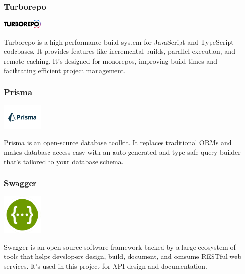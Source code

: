 \clearpage
\subsubsection*{Turborepo}

\begin{center}
\includegraphics[width=0.15\textwidth]{Images/logos/turbopack-logotype-light-background.png}
\label{fig:turborepo}
\end{center}
Turborepo is a high-performance build system for JavaScript and TypeScript codebases. It provides features like incremental builds, parallel execution, and remote caching. It’s designed for monorepos, improving build times and facilitating efficient project management.

\subsubsection*{Prisma}

\begin{center}
\includegraphics[width=0.15\textwidth]{Images/logos/Prisma.png}
\label{fig:prisma}
\end{center}
Prisma is an open-source database toolkit. It replaces traditional ORMs and makes database access easy with an auto-generated and type-safe query builder that’s tailored to your database schema.


\subsubsection*{Swagger}

\begin{center}
\includegraphics[width=0.15\textwidth]{Images/logos/Swagger-logo.png}
\label{fig:swagger}
\end{center}
Swagger is an open-source software framework backed by a large ecosystem of tools that helps developers design, build, document, and consume RESTful web services. It’s used in this project for API design and documentation.

